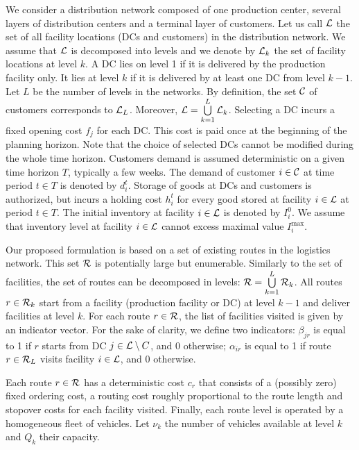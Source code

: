 \documentclass[a4paper,10pt]{article}
\begin{document}
\begin{linenumbers}
We consider a distribution network composed of one production center, several layers of distribution centers and a terminal layer of customers. Let us call $\mathcal{L}$ the set of all facility locations (DCs and customers) in the distribution network. 
We assume that $\mathcal{L}$ is decomposed into levels and we denote by $\mathcal{L}_k$ the set of facility locations at level $k$. 
A DC lies on level 1 if it is delivered by the production facility only. 
It lies at level $k$ if it is delivered by at least one DC from level $k-1$. 
Let $L$ be the number of levels in the networks. By definition, the set $\mathcal{C}$ of customers corresponds to $\mathcal{L}_L$.
Moreover, $\mathcal{L}=\bigcup\limits_{k=1}^L \mathcal{L}_k$.
%
Selecting a DC incurs a fixed opening cost $f_j$ for each DC. 
This cost is paid once at the beginning of the planning horizon. 
Note that the choice of selected DCs cannot be modified during the whole time horizon. 
%
Customers demand is assumed deterministic on a given time horizon $T$, typically a few weeks. The demand of customer $i \in \mathcal{C}$ at time period $t\in T$ is denoted by $d^t_i$.
%
Storage of goods at DCs and customers is authorized, 
but incurs a holding cost $h^t_i$ for every good stored at facility $i \in \mathcal{L}$ at period $t \in T$.
The initial inventory at facility $i \in \mathcal{L}$ is denoted by $I_i^0$. 
We assume that inventory level at facility $i \in \mathcal{L}$ cannot excess maximal value $I_i^{\max}$. 

Our proposed formulation is based on a set of existing routes in the logistics network. 
This set $\mathcal{R}$ is potentially large but enumerable. 
Similarly to the set of facilities, the set of routes can be decomposed in levels: $\mathcal{R} = \bigcup\limits_{k=1}^{L} \mathcal{R}_k$. 
All routes $r \in \mathcal{R}_k$ start from a facility (production facility or DC) at level $k-1$ and deliver facilities at level $k$. 
For each route $r \in \mathcal{R}$, the list of facilities visited is given by an indicator vector. 
For the sake of clarity, we define two indicators: 
$\beta_{jr}$ is equal to 1 if $r$ starts from DC $j \in \mathcal{L} \setminus C$, and 0 otherwise;
$\alpha_{ir}$ is equal to 1 if route $r \in \mathcal{R}_{L}$ visits facility $i \in \mathcal{L}$, and 0 otherwise.
%

Each route 	$r\in \mathcal{R}$ has a deterministic cost $c_r$ that consists of a (possibly zero) fixed ordering cost, 
a routing cost roughly proportional to the route length and stopover costs for each facility visited.  
Finally, each route level is operated by a homogeneous fleet of vehicles. 
Let $\nu_k$ the number of vehicles available at level $k$ and $Q_k$ their capacity. 
%




\end{linenumbers}
\end{document}
